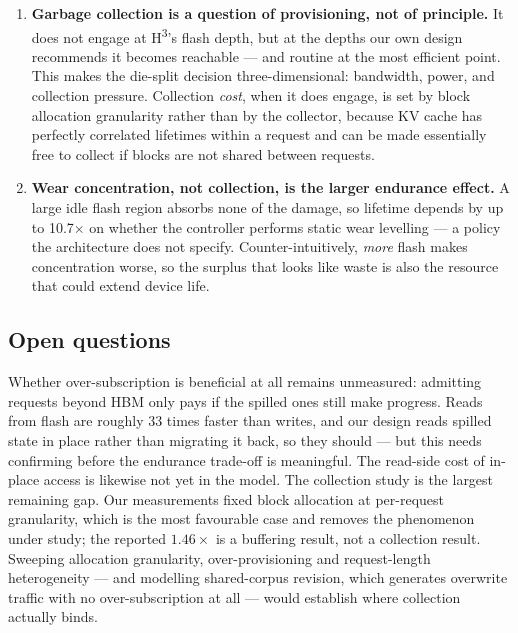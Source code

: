 \documentclass[11pt,a4paper]{article}
\begin{document}
\begin{enumerate}[itemsep=5pt]
\item \textbf{Garbage collection is a question of provisioning, not of
principle.} It does not engage at H\textsuperscript{3}'s flash depth, but at the
depths our own design recommends it becomes reachable --- and routine at the most
efficient point. This makes the die-split decision three-dimensional: bandwidth,
power, and collection pressure. Collection \emph{cost}, when it does engage, is
set by block allocation granularity rather than by the collector, because KV
cache has perfectly correlated lifetimes within a request and can be made
essentially free to collect if blocks are not shared between requests.

\item \textbf{Wear concentration, not collection, is the larger endurance
effect.} A large idle flash region absorbs none of the damage, so lifetime
depends by up to 10.7$\times$ on whether the controller performs static wear
levelling --- a policy the architecture does not specify. Counter-intuitively,
\emph{more} flash makes concentration worse, so the surplus that looks like waste
is also the resource that could extend device life.

\end{enumerate}

\subsection*{Open questions}

Whether over-subscription is beneficial at all remains unmeasured: admitting
requests beyond HBM only pays if the spilled ones still make progress. Reads
from flash are roughly 33 times faster than writes, and our design reads spilled
state in place rather than migrating it back, so they should --- but this needs
confirming before the endurance trade-off is meaningful. The read-side cost of
in-place access is likewise not yet in the model. The collection study is the largest remaining gap.
Our measurements fixed block allocation at per-request granularity, which is the
most favourable case and removes the phenomenon under study; the reported
$1.46\times$ is a buffering result, not a collection result. Sweeping allocation
granularity, over-provisioning and request-length heterogeneity --- and modelling
shared-corpus revision, which generates overwrite traffic with no
over-subscription at all --- would establish where collection actually binds.
\end{document}
